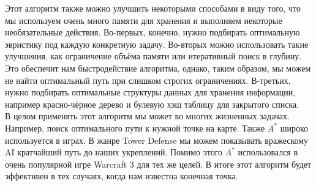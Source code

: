 \documentclass[12pt]{article}
\begin{document}
Этот алгоритм также можно улучшить некоторыми способами в виду того, что мы используем очень много памяти для хранения и выполняем некоторые необязательные действия. Во-первых, конечно, нужно подбирать оптимальную эвристику под каждую конкретную задачу. Во-вторых можно использовать такие улучшения, как ограничение объёма памяти или итеративный поиск в глубину. Это обеспечит нам быстродействие алгоритма, однако, таким образом, мы можем не найти оптимальный путь при слишком строгих ограничениях. В-третьих, нужно подбирать оптимальные структуры данных для хранения информации, например красно-чёрное дерево и булевую хэш таблицу для закрытого списка.
\\

В целом применять этот алгоритм мы может во многих жизненных задачах. Например, поиск оптимального пути к нужной точке на карте. Также $A^{*}$ широко используется в играх. В жанре Tower Defense мы можем показывать вражескому AI кратчайший путь до наших укреплений. Помимо этого $A^{*}$ использовался в очень популярной игре Warcraft 3 для тех же целей. В итоге этот алгоритм будет эффективен в тех случаях, когда нам известна конечная точка.
\end{document}

